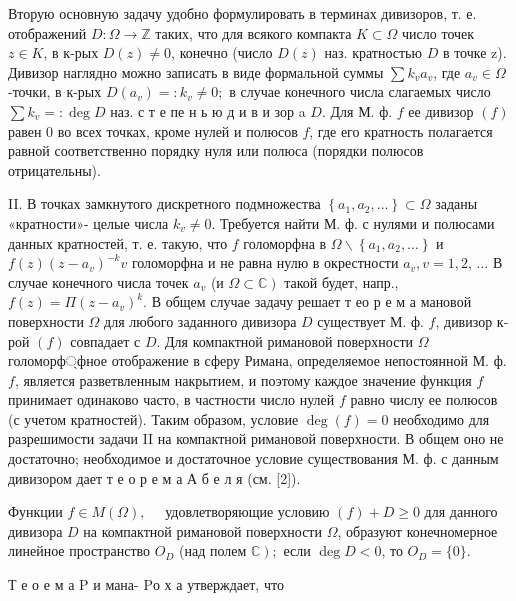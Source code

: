\documentclass[10pt]{article}
\begin{document}
Вторую основную задачу удобно формулировать в терминах дивизоров, т. е. отображений $D: \Omega \rightarrow \mathbb{Z}$ таких, что для всякого компакта $K \subset \Omega$ число точек $z \in K$, в к-рых $D(z) \neq 0$, конечно (число $D(z)$ наз. кратностью $D$ в точке z). Дивизор наглядно можно записать в виде формальной суммы $\sum k_{v} a_{v}$, где $a_{v} \in \Omega$-точки, в к-рых $D\left(a_{v}\right)=: k_{v} \neq 0 ;$ в случае конечного числа слагаемых число $\sum k_{v}=: \operatorname{deg} D$ наз. с т е пе н ь ю д и в и зор a $D$. Для М. ф. $f$ ее дивизор $(f)$ равен 0 во всех точках, кроме нулей и полюсов $f$, где его кратность полагается равной соответственно порядку нуля или полюса (порядки полюсов отрицательны).



II. В точках замкнутого дискретного подмножества $\left\{a_{1}, a_{2}, \ldots\right\} \subset \Omega$ заданы «кратности»- целые числа $k_{v} \neq 0$. Требуется найти М. ф. с нулями и полюсами данных кратностей, т. е. такую, что $f$ голоморфна в $\Omega \backslash\left\{a_{1}, a_{2}, \ldots\right\}$ и $f(z)\left(z-a_{v}\right)^{-k} v$ голоморфна и не равна нулю в окрестности $a_{v}, v=1,2$, ... В случае конечного числа точек $a_{v}$ (и $\left.\Omega \subset \mathbb{C}\right)$ такой будет, напр., $f(z)=\Pi\left(z-a_{v}\right)^{k}$. В общем случае задачу решает т ео р е м а мановой поверхности $\Omega$ для любого заданного дивизора $D$ существует М. ф. $f$, дивизор к-рой $(f)$ совпадает с $D$. Для компактной римановой поверхности $\Omega$ голоморф্фное отображение в сферу Римана, определяемое непостоянной М. ф. $f$, является разветвленным накрытием, и поэтому каждое значение функция $f$ принимает одинаково часто, в частности число нулей $f$ равно числу ее полюсов (с учетом кратностей). Таким образом, условие $\operatorname{deg}(f)=0$ необходимо для разрешимости задачи II на компактной римановой поверхности. В общем оно не достаточно; необходимое и достаточное условие существования М. ф. с данным дивизором дает т е о р е м а А б е л я (см. [2]).



Функции $f \in M(\Omega), \quad$ удовлетворяющие условию $(f)+D \geqslant 0$ для данного дивизора $D$ на компактной римановой поверхности $\Omega$, образуют конечномерное линейное пространство $O_{D}$ (над полем $\left.\mathbb{C}\right) ;$ если $\operatorname{deg} D<0$, то $O_{D}=\{0\}$.



Т е о е м а $\mathrm{P}$ и мана- $\mathrm{P} о$ х а утверждает, что
\end{document}
